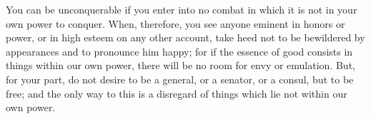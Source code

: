 You can be unconquerable if you enter into no combat in which it is not in your
own power  to conquer.  When, therefore,  you see anyone  eminent in  honors or
power, or in high  esteem on any other account, take heed  not to be bewildered
by appearances and to pronounce him happy;  for if the essence of good consists
in things within  our own power, there  will be no room for  envy or emulation.
But, for your part,  do not desire to be a general, or  a senator, or a consul,
but to be free; and the only way to this is a disregard of things which lie not
within our own power.

